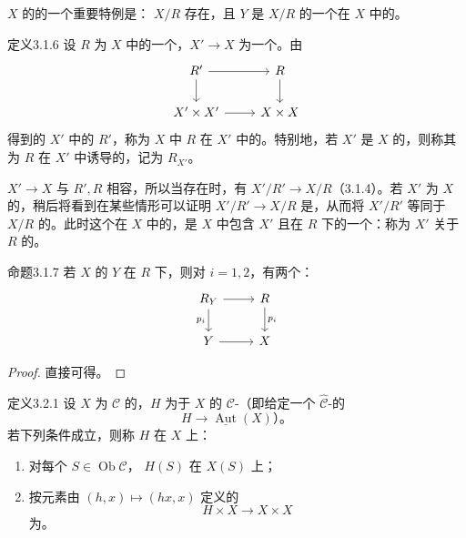 $X$ 的的一个重要特例是： $X/R$ 存在，且 $Y$ 是 $X/R$ 的一个在 $X$ 中的。
\begin{SGAresult}{定义}{3.1.6}
设 $R$ 为 $X$ 中的一个，$X'\to X$ 为一个。由
\[
\begin{tikzcd}R'\arrow[r]\arrow[d]&R\arrow[d]\\X'\times X'\arrow[r]&X\times X\end{tikzcd}
\]
得到的 $X'$ 中的 $R'$，称为 $X$ 中 $R$ 在 $X'$ 中的。特别地，若 $X'$ 是 $X$ 的，则称其为 $R$ 在 $X'$ 中诱导的，记为 $R_{X'}$。
\end{SGAresult}
 $X'\to X$ 与 $R',R$ 相容，所以当存在时，有 $X'/R'\to X/R$（3.1.4）。若 $X'$ 为 $X$ 的，稍后将看到在某些情形可以证明 $X'/R'\to X/R$ 是，从而将 $X'/R'$ 等同于 $X/R$ 的。此时这个在 $X$ 中的，是 $X$ 中包含 $X'$ 且在 $R$ 下的一个：称为 $X'$ 关于 $R$ 的。
\begin{SGAresult}{命题}{3.1.7}
若 $X$ 的 $Y$ 在 $R$ 下，则对 $i=1,2$，有两个：
\[
\begin{tikzcd}R_Y\arrow[r]\arrow[d,"p_i"']&R\arrow[d,"p_i"]\\Y\arrow[r]&X\end{tikzcd}
\]
\end{SGAresult}
\begin{proof}直接可得。\end{proof}
\begin{SGAresult}{定义}{3.2.1}
设 $X$ 为 $\mathcal C$ 的，$H$ 为于 $X$ 的 $\mathcal C$-（即给定一个 $\widehat{\mathcal C}$-的
\[
 H\longrightarrow\underline{\operatorname{Aut}}(X)\text{）。}
\]
若下列条件成立，则称 $H$ 在 $X$ 上：
\begin{enumerate}
\item[(i)] 对每个 $S\in\operatorname{Ob}\mathcal C$， $H(S)$ 在 $X(S)$ 上；
\item[(ii)] 按元素由 $(h,x)\mapsto(hx,x)$ 定义的
\[
 H\times X\longrightarrow X\times X
\]
为。
\end{enumerate}
\end{SGAresult}
